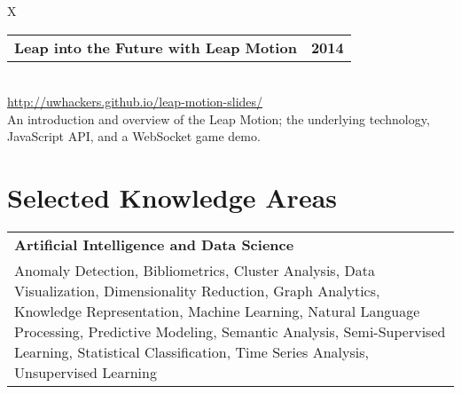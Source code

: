 \documentclass[10pt]{article}
\newcommand{\tabularxwidth}{\textwidth}
\begin{document}
        \begin{minipage}{\tabularxwidth}
        \begin{tabularx}{\tabularxwidth}{X}
            {
                \begin{tabularx}{\tabularxwidth}{@{}X r}
                    \textbf{Leap into the Future with Leap Motion} &
                    \textbf{
        2014} \\
                \end{tabularx}
            } \\

            

            
                \url{http://uwhackers.github.io/leap-motion-slides/} \\
            
            

            
    An introduction and overview of the Leap Motion; the underlying technology, JavaScript API, and a WebSocket game demo.
        \end{tabularx}
        

        \end{minipage}
    


    
        \section{Selected Knowledge Areas}

    
        \begin{tabularx}{\tabularxwidth}{X}
            \textbf{Artificial Intelligence and Data Science} \\
            
    
            Anomaly Detection, 
            Bibliometrics, 
            Cluster Analysis, 
            Data Visualization, 
            Dimensionality Reduction, 
            Graph Analytics, 
            Knowledge Representation, 
            Machine Learning, 
            Natural Language Processing, 
            Predictive Modeling, 
            Semantic Analysis, 
            Semi-Supervised Learning, 
            Statistical Classification, 
            Time Series Analysis, 
            Unsupervised Learning \\
        \end{tabularx}
\end{document}
